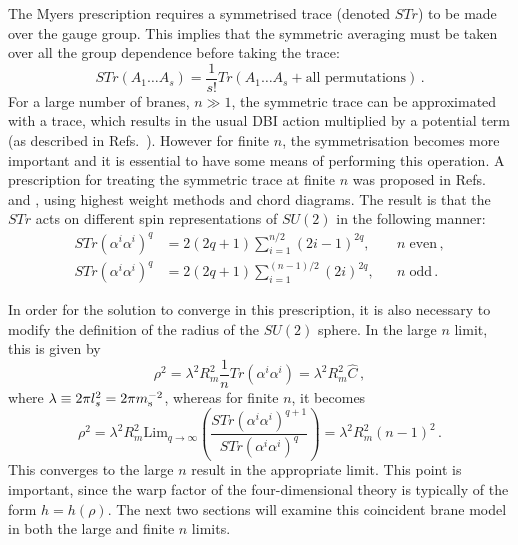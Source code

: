 The Myers prescription requires a symmetrised trace (denoted $STr$) to 
be made over the gauge group. This implies that 
the symmetric averaging must be taken over all the group dependence 
before taking the trace:
% 
\begin{equation}
 \label{eq:str-defn-multi}
 STr (A_1 \ldots A_s) = \frac{1}{s!} Tr(A_1 \ldots A_s + \text{all
permutations})\,.
\end{equation}
% 
For a large number of branes, $n \gg 1$, the symmetric trace can be
approximated with a trace, 
which results in the usual DBI action multiplied by a potential term (as
described in Refs.~\cite{thomasward, Kachru:2002gs}). 
However for finite $n$, the symmetrisation becomes more important and it
is essential to have some means of performing this operation. A prescription for
treating the symmetric trace at finite $n$ was proposed
in Refs.~\cite{Ramgoolam:2004gw} and \cite{McNamara:2005ry}, 
using highest weight methods and chord diagrams. 
% 
The result is that the $STr$ acts on different spin representations of $SU(2)$ 
in the following manner:
% 
\begin{align}
\label{eq:str-even-multi}
STr (\alpha^i \alpha^i)^q &= 2(2q+1)\sum_{i=1}^{n/2}(2i-1)^{2q} , 
&& n\; \mathrm{ even}\,, 
\\
\label{eq:str-odd-multi}
STr (\alpha^i \alpha^i)^q &= 2(2q+1)\sum_{i=1}^{(n-1)/2} (2i)^{2q} , 
&& n\; \mathrm{ odd}\,.
\end{align}
% 


In order for the solution to converge in this prescription, 
it is also necessary to modify the definition of the radius of the 
$SU(2)$ sphere. In the large $n$ limit, this is given by
% 
\begin{equation}
\label{eq:largen-rho-multi}
\rho^2 = \lambda^2 R_m^2 \frac{1}{n} Tr(\alpha^i \alpha^i) = \lambda^2 R_m^2
\hat{C} \,,
\end{equation}
% 
where $\lambda \equiv 2\pi l_s^2 = 2\pi m_\mathrm{s}^{-2}$, 
whereas for finite $n$, it becomes
% 
\begin{equation}
\label{eq:finiten-rho-multi}
\rho^2 = \lambda^2 R_m^2 \mathrm{Lim}_{q \to \infty} \left(\frac{STr (\alpha^i
\alpha^i)^{q+1}}{STr(\alpha^i \alpha^i)^q} \right) 
= \lambda^2 R_m^2 (n-1)^2 \,.
\end{equation}
% 
This converges to the large $n$ result in the appropriate limit.
This point is important, since the warp factor 
of the four-dimensional theory is typically of the form $h= h(\rho)$.
% 
The next two sections will examine this coincident brane model in both the
large and finite $n$ limits. 

